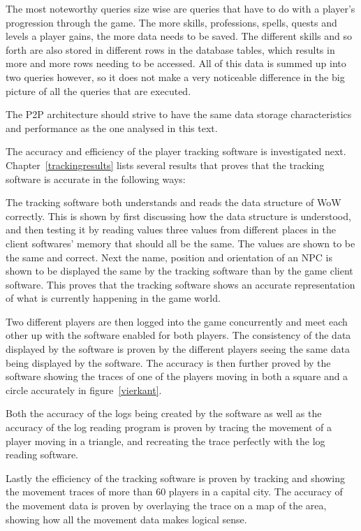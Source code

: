 The most noteworthy queries size wise are queries that have to do with a player's progression through the game. The more skills, professions, spells, quests and levels a player gains, the more data needs to be saved. The different skills and so forth are also stored in different rows in the database tables, which results in more and more rows needing to be accessed. All of this data is summed up into two queries however, so it does not make a very noticeable difference in the big picture of all the queries that are executed.

The P2P architecture should strive to have the same data storage characteristics and performance as the one analysed in this text.

The accuracy and efficiency of the player tracking software is investigated next. Chapter~\ref{trackingresults} lists several results that proves that the tracking software is accurate in the following ways:

The tracking software both understands and reads the data structure of WoW correctly. This is shown by first discussing how the data structure is understood, and then testing it by reading values three values from different places in the client softwares' memory that should all be the same. The values are shown to be the same and correct. Next the name, position and orientation of an NPC is shown to be displayed the same by the tracking software than by the game client software. This proves that the tracking software shows an accurate representation of what is currently happening in the game world.

Two different players are then logged into the game concurrently and meet each other up with the software enabled for both players. The consistency of the data displayed by the software is proven by the different players seeing the same data being displayed by the software. The accuracy is then further proved by the software showing the traces of one of the players moving in both a square and a circle accurately in figure~\ref{vierkant}.

Both the accuracy of the logs being created by the software as well as the accuracy of the log reading program is proven by tracing the movement of a player moving in a triangle, and recreating the trace perfectly with the log reading software.

Lastly the efficiency of the tracking software is proven by tracking and showing the movement traces of more than 60 players in a capital city. The accuracy of the movement data is proven by overlaying the trace on a map of the area, showing how all the movement data makes logical sense.

